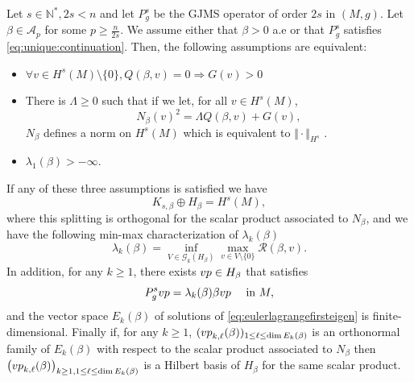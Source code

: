 \documentclass[10pt,a4paper]{amsart}
\newcommand{\vp}{{\rm vp}}
\begin{document}
\begin{prop} \label{prop:wellposedmu_1}
Let $s \in \mathbb{N}^*, 2s <n$ and let $P_g^s$ be the GJMS operator of order $2s$ in $(M,g)$. Let $\beta \in \mathcal{A}_p$ for some $p\geq \frac{n}{2s}$. We assume either that $\beta >0$ a.e or that $P_g^s$ satisfies \eqref{eq:unique:continuation}. Then, the following assumptions are equivalent:
\begin{itemize}
\item[(i)]$ \forall v \in H^s(M)\setminus\{0\}, Q(\beta,v) = 0 \Rightarrow G(v) > 0 $
\item[(ii)] There is $\Lambda \geq 0$ such that if we let, for all $v \in H^s(M)$, %
$$ N_\beta (v)^2= \Lambda Q(\beta,v) + G(v) ,$$
$N_\beta$ defines a norm on $H^s(M)$ which is equivalent to $\Vert \cdot \Vert_{H^s}$ .
\item[(iii)] $\lambda_1(\beta)>-\infty$.
\end{itemize}
If any of these three assumptions is satisfied %
we have
\begin{equation} \label{eq:directsumKbetaHbeta} K_{s,\beta} \oplus H_\beta = H^s(M), \end{equation}
where this splitting is orthogonal for the scalar product associated to $N_{\beta}$, and we have the following min-max characterization of $\lambda_k(\beta)$
\begin{equation} \label{eq:newminmu1} \lambda_k(\beta) = \inf_{V \in \mathcal{G}_k(H_\beta)} \max_{v \in V \setminus \{0\}} \mathcal{R}(\beta,v). \end{equation}
In addition, for any $k \ge 1$, there exists $\vp \in H_\beta$ that satisfies
\begin{equation}\label{eq:eulerlagrangefirsteigen} P_g^s \vp = \lambda_k(\beta) \beta \vp \quad \text{ in } M, \end{equation}
and the vector space $E_k(\beta)$ of solutions of \eqref{eq:eulerlagrangefirsteigen} is finite-dimensional. Finally if, for any $k \ge 1$, $(\vp_{k,\ell}(\beta))_{1 \le \ell \le \dim E_k(\beta)}$ is an orthonormal family of $E_k(\beta)$ with respect to the scalar product associated to $N_{\beta}$ then $\big( \vp_{k,\ell}(\beta)\big)_{k \ge 1, 1 \le \ell \le \dim E_k(\beta)}$ is a Hilbert basis of $H_\beta$ for the same scalar product.
\end{prop}
\end{document}
